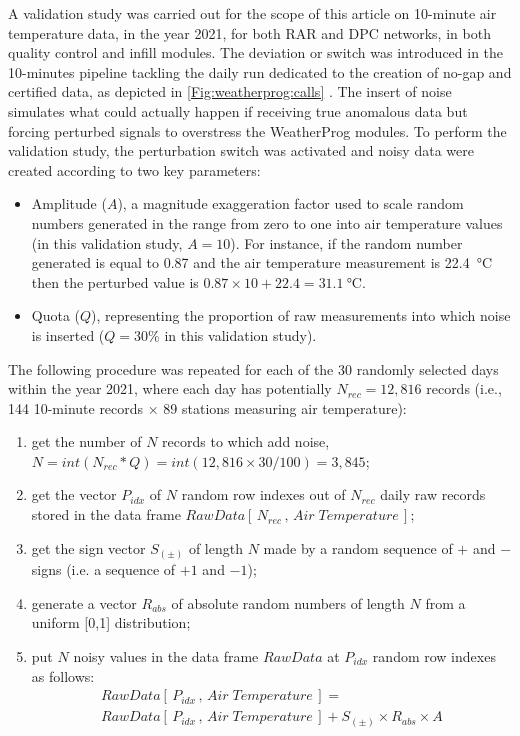 \documentclass[authoryear,preprint,review,12pt]{elsarticle}
\newcommand{\note}[1]{\emph{\textcolor{red}{#1}}}
\begin{document}
A validation study was carried out for the scope of this article on 10-minute air temperature data, in the year 2021, for both RAR and DPC networks, in both quality control and infill modules.
The deviation or switch was introduced in the 10-minutes pipeline tackling the daily run dedicated to the creation of no-gap and certified data, as depicted in \cref{Fig:weatherprog:calls} .%
The insert of noise simulates what could actually happen if receiving true anomalous data but forcing perturbed signals to overstress the WeatherProg modules.
To perform the validation study, the perturbation switch was activated and noisy data were created according to two key parameters:
\begin{itemize}
    \item Amplitude ($A$), a magnitude exaggeration factor used to scale random numbers generated in the range from zero to one into air temperature values (in this validation study, $A=10$). For instance, if the random number generated is equal to 0.87 and the air temperature measurement is \SI{22.4}{\degreeCelsius} then the perturbed value is $0.87\times10 + 22.4 = \SI{31.1}{\degreeCelsius}$.
    \item Quota ($Q$), representing the proportion of raw measurements into which noise is inserted ($Q=30\%$ in this validation study).
\end{itemize}
The following procedure was repeated for each of the 30
randomly selected days within the year 2021, where each day has potentially $N_{rec}=12,816$ records (i.e., 144 10-minute records $\times$ 89 stations measuring air temperature):

\begin{enumerate}
    \item get the number of $N$ records to which add noise, $N = int( N_{rec} * Q ) = int(12,816 \times 30 / 100) = 3,845$;
    \item get the vector $P_{idx}$ of $N$ random row indexes out of $N_{rec}$ daily raw records stored in the data frame $RawData[\,N_{rec}\,,\,Air \; Temperature\,]$;
    \item get the sign vector $S_{(\pm)}$ of length $N$ made by a random sequence of $+$ and $-$ signs (i.e. a sequence of $+1$ and $-1$);
    \item generate a vector $R_{abs}$ of absolute random numbers of length $N$ from a uniform [0,1] distribution;
    \item put $N$ noisy values in the data frame $RawData$ at $P_{idx}$ random row indexes as follows:
    \begin{multline}
    RawData[\,P_{idx}\,,\,Air \; Temperature\,] = \\
    RawData[\,P_{idx}\,,\,Air \; Temperature\,] + S_{(\pm)} \times R_{abs} \times A      
    \end{multline}
\end{enumerate}
\end{document}
